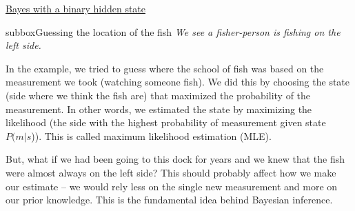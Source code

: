 \begin{textbox}{\href{https://compneuro.neuromatch.io/tutorials/W3D1_BayesianDecisions/student/W3D1_Tutorial1.html}{Bayes with a binary hidden state } }
\begin{subbox}{subbox}{Guessing the location of the fish}
\textit{We see a fisher-person is fishing on the left side.}
 
In the example, we tried to guess where the school of fish was based on the measurement we took (watching someone fish). We did this by choosing the state (side where we think the fish are) that maximized the probability of the measurement. In other words, we estimated the state by maximizing the likelihood (the side with the highest probability of measurement given state $P(m|s$)). This is called maximum likelihood estimation (MLE).

But, what if we had been going to this dock for years and we knew that the fish were almost always on the left side? This should probably affect how we make our estimate -- we would rely less on the single new measurement and more on our prior knowledge. This is the fundamental idea behind Bayesian inference.

\end{subbox}

\end{textbox}
